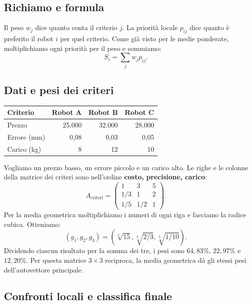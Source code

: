 \subsection*{Richiamo e formula}

\noindent Il peso $w_j$ dice quanto conta il criterio $j$.
La priorità locale $p_{ij}$ dice quanto è preferito il robot $i$
per quel criterio. Come già visto per le medie ponderate,
moltiplichiamo ogni priorità per il peso e sommiamo:
\[
    S_i=\sum_j w_j p_{ij}.
\]

\subsection*{Dati e pesi dei criteri}

\begin{center}
    \begin{tabular}{lrrr}
        \hline
        Criterio & Robot A & Robot B & Robot C \\
        \hline
        Prezzo & 25.000 & 32.000 & 28.000 \\
        Errore (mm) & 0,08 & 0,03 & 0,05 \\
        Carico (kg) & 8 & 12 & 10 \\
        \hline
    \end{tabular}
\end{center}

\noindent Vogliamo un prezzo basso, un errore piccolo e un carico alto.
Le righe e le colonne della matrice dei criteri sono nell'ordine
\textbf{costo, precisione, carico}:
\[
    A_{\text{criteri}}=\begin{pmatrix}
        1 & 3 & 5\\
        1/3 & 1 & 2\\
        1/5 & 1/2 & 1
    \end{pmatrix}.
\]
\noindent Per la media geometrica moltiplichiamo i numeri di ogni
riga e facciamo la radice cubica. Otteniamo:
\[
    (g_1,g_2,g_3)=
    \left(\sqrt[3]{15},\sqrt[3]{2/3},\sqrt[3]{1/10}\right).
\]
\noindent Dividendo ciascun risultato per la somma dei tre,
i pesi sono $64{,}83\%$, $22{,}97\%$ e $12{,}20\%$.
Per questa matrice $3\times3$ reciproca, la media geometrica
dà gli stessi pesi dell'autovettore principale.

\subsection*{Confronti locali e classifica finale}


